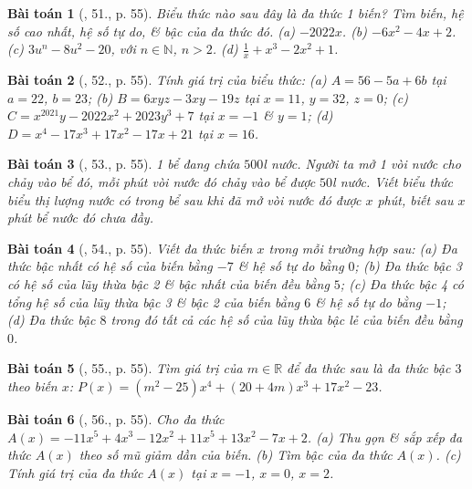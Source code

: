 \documentclass{article}
\newtheorem{baitoan}{Bài toán}
\begin{document}
\begin{baitoan}[\cite{SBT_Toan_7_Canh_Dieu_tap_2}, 51., p. 55]
	Biểu thức nào sau đây là đa thức 1 biến? Tìm biến, hệ số cao nhất, hệ số tự do, \& bậc của đa thức đó. (a) $-2022x$. (b) $-6x^2 - 4x + 2$. (c) $3u^n - 8u^2 - 20$, với $n\in\mathbb{N}$, $n > 2$. (d) $\frac{1}{x} + x^3 - 2x^2 + 1$.
\end{baitoan}

\begin{baitoan}[\cite{SBT_Toan_7_Canh_Dieu_tap_2}, 52., p. 55]
	Tính giá trị của biểu thức: (a) $A = 56 - 5a + 6b$ tại $a = 22$, $b = 23$; (b) $B = 6xyz - 3xy - 19z$ tại $x = 11$, $y = 32$, $z = 0$; (c) $C = x^{2021}y - 2022x^2 + 2023y^3 + 7$ tại $x = -1$ \& $y = 1$; (d) $D = x^4 - 17x^3 + 17x^2 - 17x + 21$ tại $x = 16$.
\end{baitoan}

\begin{baitoan}[\cite{SBT_Toan_7_Canh_Dieu_tap_2}, 53., p. 55]
	1 bể đang chứa $500$\emph{l} nước. Người ta mở 1 vòi nước cho chảy vào bể đó, mỗi phút vòi nước đó chảy vào bể được $50$\emph{l} nước. Viết biểu thức biểu thị lượng nước có trong bể sau khi đã mở vòi nước đó được $x$ phút, biết sau $x$ phút bể nước đó chưa đầy.
\end{baitoan}

\begin{baitoan}[\cite{SBT_Toan_7_Canh_Dieu_tap_2}, 54., p. 55]
	Viết đa thức biến $x$ trong mỗi trường hợp sau: (a) Đa thức bậc nhất có hệ số của biến bằng $-7$ \& hệ số tự do bằng $0$; (b) Đa thức bậc 3 có hệ số của lũy thừa bậc 2 \& bậc nhất của biến đều bằng $5$; (c) Đa thức bậc 4 có tổng hệ số của lũy thừa bậc 3 \& bậc 2 của biến bằng $6$ \& hệ số tự do bằng $-1$; (d) Đa thức bậc $8$ trong đó tất cả các hệ số của lũy thừa bậc lẻ của biến đều bằng $0$.
\end{baitoan}

\begin{baitoan}[\cite{SBT_Toan_7_Canh_Dieu_tap_2}, 55., p. 55]
	Tìm giá trị của $m\in\mathbb{R}$ để đa thức sau là đa thức bậc $3$ theo biến $x$: $P(x) = (m^2 - 25)x^4 + (20 + 4m)x^3 + 17x^2 - 23$.
\end{baitoan}

\begin{baitoan}[\cite{SBT_Toan_7_Canh_Dieu_tap_2}, 56., p. 55]
	Cho đa thức $A(x) = -11x^5 + 4x^3 - 12x^2 + 11x^5 + 13x^2 - 7x + 2$. (a) Thu gọn \& sắp xếp đa thức $A(x)$ theo số mũ giảm dần của biến. (b) Tìm bậc của đa thức $A(x)$. (c) Tính giá trị của đa thức $A(x)$ tại $x = -1$, $x = 0$, $x = 2$.
\end{baitoan}
\end{document}
